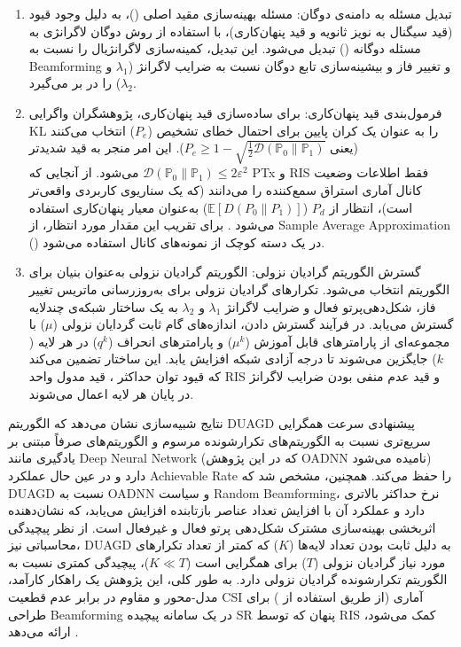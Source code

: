 \begin{enumerate}
	\item 
تبدیل مسئله به دامنه‌ی دوگان: مسئله بهینه‌سازی مقید اصلی 
()،
 به دلیل وجود قیود (قید سیگنال به نویز ثانویه و قید پنهان‌کاری)، با استفاده از روش دوگان لاگرانژی به مسئله دوگانه 
()
  تبدیل می‌شود. این تبدیل، کمینه‌سازی لاگرانژیال را نسبت به 
\gls{Beamforming}
  و تغییر فاز و بیشینه‌سازی تابع دوگان نسبت به ضرایب لاگرانژ
($\lambda_1$ و $\lambda_2$)
را در بر می‌گیرد.
\item
فرمول‌بندی قید پنهان‌کاری: برای ساده‌سازی قید پنهان‌کاری، پژوهشگران واگرایی KL را به عنوان یک کران پایین برای احتمال خطای تشخیص
($P_e$)
 انتخاب می‌کنند (یعنی
$P_e \ge 1 - \sqrt{\frac{1}{2} \mathcal{D}(\mathbb{P}_0 \| \mathbb{P}_1)}$).
این امر منجر به قید شدیدتر 
$\mathcal{D}(\mathbb{P}_0 \| \mathbb{P}_1) \le 2 \varepsilon^2$
می‌شود. از آنجایی که PTx و RIS فقط اطلاعات وضعیت کانال آماری استراق سمع‌کننده را می‌دانند (که یک سناریوی کاربردی واقعی‌تر است)، انتظار از 
$P_d$
($\mathbb{E} \left[ D(P_0 \| P_1) \right]$)
 به‌عنوان معیار پنهان‌کاری استفاده می‌شود . برای تقریب این مقدار مورد انتظار، از 
\gls{Sample Average Approximation}
  ()
   در یک دسته کوچک از نمونه‌های کانال استفاده می‌شود.
\item
گسترش الگوریتم گرادیان نزولی: الگوریتم گرادیان نزولی به‌عنوان بنیان برای الگوریتم 
 انتخاب می‌شود. تکرارهای گرادیان نزولی برای به‌روزرسانی ماتریس تغییر فاز، شکل‌دهی‌پرتو فعال و ضرایب لاگرانژ
$\lambda_1$ و $\lambda_2$
به یک ساختار شبکه‌ی چندلایه گسترش می‌یابد. در فرآیند گسترش دادن، اندازه‌های گام ثابت گردایان نزولی 
($\mu$)
 با مجموعه‌ای از پارامترهای قابل آموزش
($μ^{k}$)
 و پارامترهای انحراف
($q^{k}$)
   در هر لایه 
($k$)
    جایگزین می‌شوند تا درجه آزادی شبکه افزایش یابد. این ساختار تضمین می‌کند که قیود توان حداکثر 
،
     قید مدول واحد RIS و قید عدم منفی بودن ضرایب لاگرانژ در پایان هر لایه اعمال می‌شوند.
\end{enumerate}
نتایج شبیه‌سازی نشان می‌دهد که الگوریتم DUAGD پیشنهادی سرعت همگرایی سریع‌تری نسبت به الگوریتم‌های تکرارشونده مرسوم و الگوریتم‌های صرفاً مبتنی بر یادگیری مانند
\gls{Deep Neural Network}
(که در این پژوهش 
\gls{OADNN}
 نامیده می‌شود) دارد و در عین حال عملکرد 
\gls{Achievable Rate}
 را حفظ می‌کند. همچنین، مشخص شد که DUAGD نسبت به OADNN و سیاست 
\gls{Random Beamforming}،
  نرخ حداکثر بالاتری دارد و عملکرد آن با افزایش تعداد عناصر بازتابنده افزایش می‌یابد، که نشان‌دهنده اثربخشی بهینه‌سازی مشترک شکل‌دهی پرتو فعال و غیرفعال است. از نظر پیچیدگی محاسباتی نیز، DUAGD به دلیل ثابت بودن تعداد لایه‌ها 
($K$)
   که کمتر از تعداد تکرارهای مورد نیاز گرادیان نزولی 
($T$)
    برای همگرایی است 
($K \ll T$)،
     پیچیدگی کمتری نسبت به الگوریتم تکرارشونده گرادیان نزولی دارد.
به طور کلی، این پژوهش یک راهکار کارآمد، مدل-محور و مقاوم در برابر عدم قطعیت CSI آماری (از طریق استفاده از
) برای طراحی 
\gls{Beamforming}
 در یک سامانه پیچیده SR پنهان که توسط RIS کمک می‌شود، ارائه می‌دهد
\cite{JointActive}.
